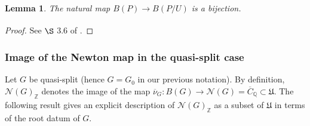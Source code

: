 \documentclass[11pt,a4paper]{article}
\theoremstyle{definition}
\theoremstyle{plain}
\newtheorem{Le}[shared]{Lemma}
\theoremstyle{remark}
\theoremstyle{plain}
\begin{document}
\begin{Le}\label{unipotentlemma}
    The natural map $B(P) \xrightarrow[]{} B(P/U)$ is a bijection.
\end{Le}
\begin{proof}
    See $\S$ 3.6 of \cite{MR1485921}.
\end{proof}

\subsubsection{Image of the Newton map in the quasi-split case}\label{integralnewtonpoints}
Let $G$ be quasi-split (hence $G = G_0$ in our previous notation). By definition, $\mathcal{N}(G)_{\mathbb{Z}}$ denotes the image of the map $\overline{\nu}_G: B(G) \xrightarrow[]{} \mathcal{N}(G) = \overline{C}_{\mathbb{Q}} \subset \mathfrak{U}$. The following result gives an explicit description of $\mathcal{N}(G)_{\mathbb{Z}}$ as a subset of $\mathfrak{U}$ in terms of the root datum of $G$.
\end{document}
